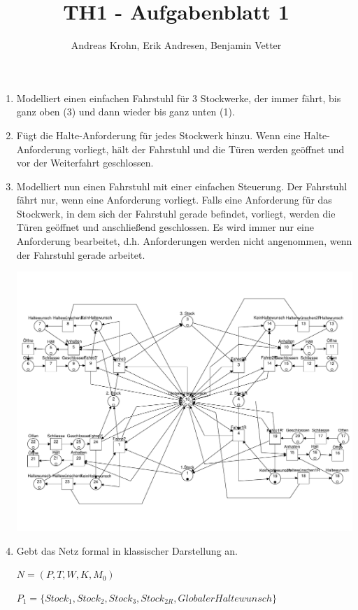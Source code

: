 \documentclass{scrreprt}
\title{TH1 - Aufgabenblatt 1}
\author{Andreas Krohn, Erik Andresen, Benjamin Vetter}
\begin{document}
\maketitle

\begin{enumerate}
\item Modelliert einen einfachen Fahrstuhl für 3 Stockwerke, der immer fährt, bis ganz oben (3) und dann wieder bis ganz unten (1).

\item Fügt die Halte-Anforderung für jedes Stockwerk hinzu. Wenn eine Halte-Anforderung vorliegt, hält der Fahrstuhl und die Türen werden geöffnet und vor der Weiterfahrt geschlossen.

\item Modelliert nun einen Fahrstuhl mit einer einfachen Steuerung. Der Fahrstuhl fährt nur, wenn eine Anforderung vorliegt. Falls eine Anforderung für das Stockwerk, in dem sich der Fahrstuhl gerade befindet, vorliegt, werden die Türen geöffnet und anschließend geschlossen. Es wird immer nur eine Anforderung bearbeitet, d.h. Anforderungen werden nicht angenommen, wenn der Fahrstuhl gerade arbeitet.

\includegraphics[width=1\textwidth]{prak_aufg3_fertig_bugfix.pdf}

\item Gebt das Netz formal in klassischer Darstellung an.

$N = (P, T, W, K, M_0)$

$P_1 = \{ Stock_1, Stock_2, Stock_3, Stock_{2R}, GlobalerHaltewunsch \}$


\end{enumerate}
\end{document}
